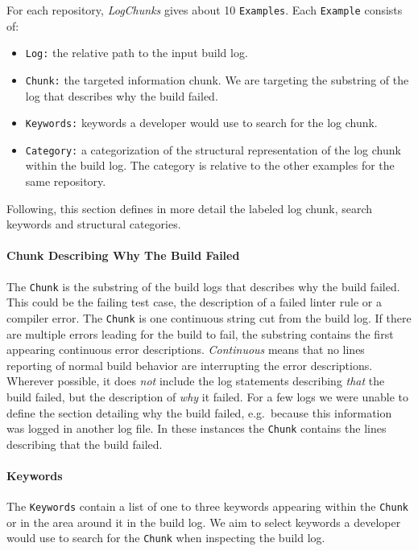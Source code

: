 \documentclass[\myrootdir/main.tex]{subfiles}
\begin{document}
For each repository, \emph{LogChunks} gives about 10 \texttt{Examples}.
Each \texttt{Example} consists of:
\begin{itemize}
	\item \texttt{Log:} the relative path to the input build log.
	\item \texttt{Chunk:} the targeted information chunk. We are targeting the substring of the log that describes why the build failed.
	\item \texttt{Keywords:} keywords a developer would use to search for the log chunk.
	\item \texttt{Category:} a categorization of the structural representation of the log chunk within the build log.
				The category is relative to the other examples for the same repository.
\end{itemize}
Following, this section defines in more detail the labeled log chunk, search keywords and structural categories.

\paragraph{Chunk Describing Why The Build Failed}
The \texttt{Chunk} is the substring of the build logs that describes why the build failed.
This could be the failing test case, the description of a failed linter rule or a compiler error.
The \texttt{Chunk} is one continuous string cut from the build log.
If there are multiple errors leading for the build to fail, the substring contains the first appearing continuous error descriptions.
\emph{Continuous} means that no lines reporting of normal build behavior are interrupting the error descriptions.
Wherever possible, it does \emph{not} include the log statements describing \emph{that} the build failed, but the description of \emph{why} it failed.
For a few logs we were unable to define the section detailing why the build failed, e.g.\ because this information was logged in another log file.
In these instances the \texttt{Chunk} contains the lines describing that the build failed.

\paragraph{Keywords}
The \texttt{Keywords} contain a list of one to three keywords appearing within the \texttt{Chunk} or in the area around it in the build log.
We aim to select keywords a developer would use to search for the \texttt{Chunk} when inspecting the build log.
\end{document}
